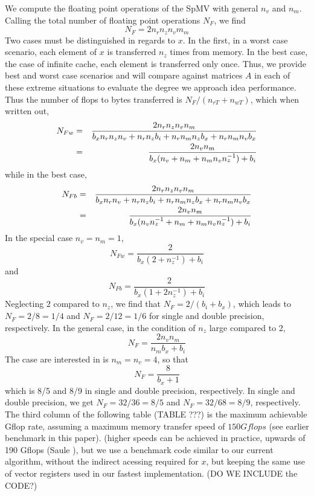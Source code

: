 \documentclass[10pt,conference,compsocconf]{IEEEtran}
\begin{document}
We compute the floating point operations of the SpMV with general $n_v$ and $n_m$. Calling the total number of floating point operations $N_F$, we find
$$
  N_F = 2 n_r n_z n_v m_m
$$
Two cases must be distinguished in regards to $x$. In the first, in a worst case scenario, each element 
of $x$ is transferred $n_z$ times from memory. In the best case, the case of infinite cache, each element is transferred only once. Thus, we provide best and worst case scenarios and will compare against matrices $A$
in each of these extreme situations to evaluate the degree we approach idea performance. 
Thus the number of flops to bytes transferred is $N_F / (n_{rT} + n_{wT})$, which when written out, 
\begin{eqnarray}
N_{Fw} &=& \frac{2 n_r n_z n_v n_m}{b_x n_r n_z n_v  + n_r n_z b_i + n_r n_m n_z b_x + n_r n_m n_v b_x} \nonumber \\
    &=& \frac{2 n_v n_m}{b_x ( n_v + n_m + n_m n_v n_z^{-1}) + b_i}  \nonumber \\
\end{eqnarray}
while in the best case, 
\begin{eqnarray}
N_{Fb} &=& \frac{2 n_r n_z n_v n_m}{b_x n_r n_v  + n_r n_z b_i + n_r n_m n_z b_x + n_r n_m n_v b_x} \nonumber \\
    &=& \frac{2 n_v n_m}{b_x ( n_v n_z^{-1} + n_m  + n_m n_v n_z^{-1}) + b_i } 
\end{eqnarray}
In the special case $n_v=n_m=1$, 
$$
N_{Fw} = \frac{2}{b_x (2+n_z^{-1}) + b_i}
$$
and 
$$
N_{Fb} = \frac{2}{b_x (1 + 2 n_z^{-1}) + b_i}
$$
Neglecting $2$ compared to $n_z$, we find that $N_F = 2/(b_i+b_x)$, which leads to 
$N_F = 2/8=1/4$ and  $N_F=2/12=1/6$ for single and double precision, respectively. 
In the general case, in the condition of $n_z$ large compared to 2, 
$$
N_F =  \frac{2 n_v n_m}{n_m b_x + b_i}
$$ 
The case are interested in is $n_m=n_v=4$, so that
$$
N_F = \frac{8}{ b_x + 1}
$$ which is 8/5 and 8/9 in single and double precision, respectively.
In single and double precision, we get $N_F=32/36=8/5$ and
$N_F=32/68=8/9$, respectively.  The third column of the following
table (TABLE ???) is the maximum achievable Gflop rate, assuming a
maximum memory transfer speed of $150 Gflops$ (see earlier benchmark
in this paper).  (higher speeds can be achieved in practice, upwards
of 190 Gflops (Saule \etal\cite{}), but we use a benchmark code
similar to our current algorithm, without the indirect acessing
required for $x$, but keeping the same use of vector registers used in
our fastest implementation. (DO WE INCLUDE the CODE?)
\end{document}
